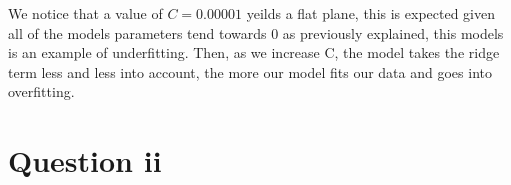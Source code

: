 \documentclass[10pt]{article}
\begin{document}
\begin{figure}[H]
\end{figure}

We notice that a value of $C = 0.00001$ yeilds a flat plane, this is expected given all of the
models parameters tend towards 0 as previously explained, this models is an example of underfitting. Then, as we increase C,
the model takes the ridge term less and less into account, the more our model fits our data and goes into overfitting.

\section*{Question ii}
\end{document}
